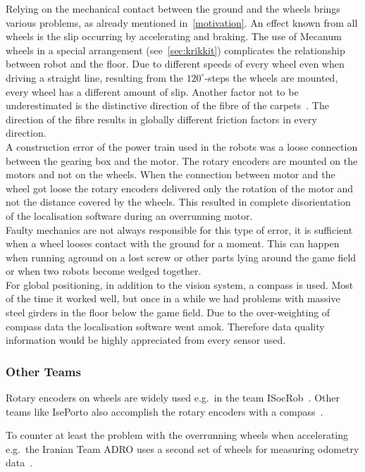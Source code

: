 \documentclass[12pt,a4paper]{article}
\begin{document}
Relying on the mechanical contact between the ground and the wheels brings various problems, as already mentioned in~\autoref{motivation}.
An effect known from all wheels is the slip occurring by accelerating and braking.
The use of Mecanum wheels in a special arrangement (see~\autoref{sec:krikkit}) complicates the relationship between robot and the floor. %
Due to different speeds of every wheel even when driving a straight line, resulting from the $120^\circ$\mbox{-}steps the wheels are mounted, every wheel has a different amount of slip.
Another factor not to be underestimated is the distinctive direction of the fibre of the carpets~\cite{mecanum2007}.
The direction of the fibre results in globally different friction factors in every direction.\\
A construction error of the power train used in the %
robots was a loose connection between the gearing box and the motor.
The rotary encoders are mounted on the motors and not on the wheels.
When the connection between motor and the wheel got loose the rotary encoders delivered only the rotation of the motor and not the distance covered by the wheels. 
This resulted in complete disorientation of the localisation software during an overrunning motor.\\
Faulty mechanics are not always responsible for this type of error, it is sufficient when a wheel looses contact with the ground for a moment.
This can happen when running aground on a lost screw or other parts lying around the game field or when two robots become wedged together.\\
For global positioning, in addition to the vision system, a compass is used.
Most of the time it worked well, but once in a while we had problems with massive steel girders in the floor below the game field.
Due to the over-weighting of compass data the localisation software went amok.
Therefore data quality information would be highly appreciated from every sensor used.

\subsubsection{Other Teams}

Rotary encoders on wheels are widely used e.g.\ in the team ISocRob~\cite{isocrob}.
Other teams like IsePorto also accomplish the rotary encoders with a compass~\cite{iseporto}.

To counter at least the problem with the overrunning wheels when accelerating e.g.\ the Iranian Team ADRO uses a second set of wheels for measuring odometry data~\cite{adro}.
\end{document}
